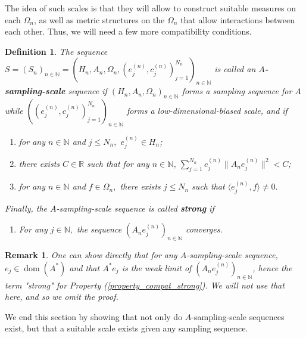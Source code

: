 \documentclass[10pt,a4paper]{amsart}
\newtheorem{defn}[thm]{Definition}
\newtheorem{remark}[thm]{Remark}
\def \Dom{\operatorname{dom}}
\newcounter{pointnumber}
\begin{document}
The idea of such scales is that they will allow to construct suitable measures on each $\Omega_n$, as well as metric structures on the $\Omega_n$ that allow interactions between each other. Thus, we will need a few more compatibility conditions.
\begin{defn}\label{definition_sampling_scale_sequence}
	The sequence $S=(S_n)_{n\in\mathbb{N}}=(H_n,A_n,\Omega_n,(e_j^{(n)},c_j^{(n)})_{j=1}^{N_n})_{n\in\mathbb{N}}$ is called an \textbf{$A$-sampling-scale} sequence if $(H_n,A_n,\Omega_n)_{n\in\mathbb{N}}$ forms a sampling sequence for $A$ while $((e_j^{(n)},c_j^{(n)})_{j=1}^{N_n})_{n\in\mathbb{N}}$ forms a low-dimensional-biased scale, and if
	\begin{enumerate}
		\setcounter{enumi}{\value{pointnumber}}
		\item\label{property_compat_H} for any $n\in\mathbb{N}$ and $j\leq N_n,$ $e_j^{(n)}\in H_n$;
		\item\label{property_compat_A} there exists $C\in\mathbb{R}$ such that for any $n\in\mathbb{N}$, $\sum_{j=1}^{N_n}c_j^{(n)}\|A_ne_j^{(n)}\|^2<C$;
		\item\label{property_compat_Omega} for any $n\in\mathbb{N}$ and $f\in\Omega_n,$ there exists $j\leq N_n$ such that $\langle e_j^{(n)},f \rangle \neq 0.$
		\setcounter{pointnumber}{\value{enumi}}
	\end{enumerate}
	
	Finally, the $A$-sampling-scale sequence is called \textbf{strong} if 
	\begin{enumerate}
		\setcounter{enumi}{\value{pointnumber}}
		\item\label{property_compat_strong} For any $j\in\mathbb{N},$ the sequence $(A_ne_j^{(n)})_{n\in\mathbb{N}}$ converges.
	\end{enumerate}	
\end{defn}
\begin{remark}
	One can show directly that for any $A$-sampling-scale sequence, $e_j\in\Dom(A^*)$ and that $A^* e_j$ is the weak limit of $(A_n e_j^{(n)})_{n\in\mathbb{N}}$, hence the term "strong" for Property (\ref{property_compat_strong}). We will not use that here, and so we omit the proof.
\end{remark}
We end this section by showing that not only do $A$-sampling-scale sequences exist, but that a suitable scale exists given any sampling sequence.
\end{document}
